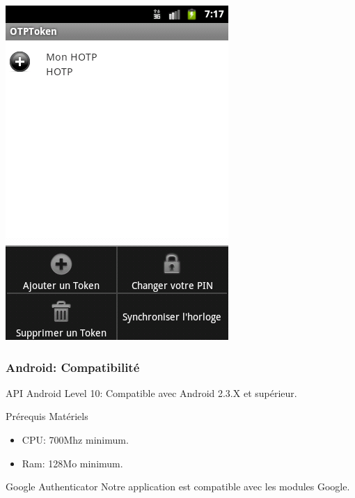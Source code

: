 \documentclass[xcolor=table]{beamer}
\begin{document}
\begin{frame}
\includegraphics[scale=0.33]{../graphics/menu.png}
\end{frame}

\begin{frame}
\frametitle{Android: Compatibilité}
\begin{block}{API Android}
Level 10: Compatible avec Android 2.3.X et supérieur.
\end{block}
\begin{block}{Prérequis Matériels}
\begin{itemize}
\item CPU: 700Mhz minimum.
\item Ram: 128Mo minimum.
\end{itemize}
\end{block}
\begin{block}{Google Authenticator}
Notre application est compatible avec les modules Google.
\end{block}
\end{frame}
\end{document}
